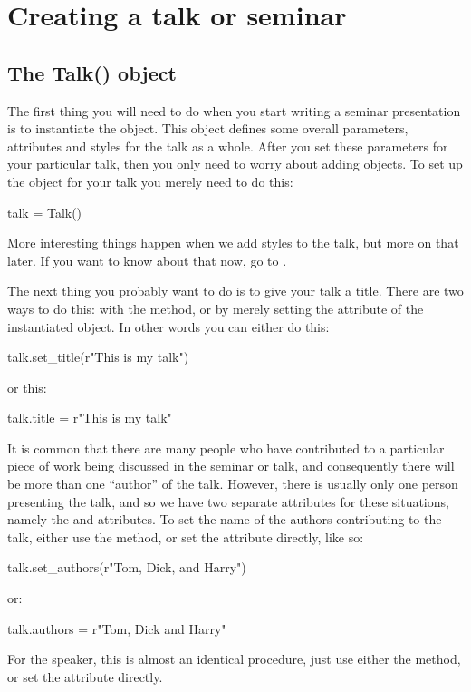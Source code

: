 \section{Creating a talk or seminar}

\subsection{The Talk() object}

The first thing you will need to do when you start writing a seminar
presentation is to instantiate the  object.  This object defines
some overall parameters, attributes and styles for the talk as a whole.
After you set these parameters for your particular talk, then you only need
to worry about adding  objects.  To set up the 
object for your talk you merely need to do this:
\begin{python}
talk = Talk()
\end{python}
More interesting things happen when we add styles to the talk, but more on
that later.  If you want to know about that now, go to .

The next thing you probably want to do is to give your talk a title.  There
are two ways to do this: with the  method, or by merely
setting the  attribute of the instantiated  object.
In other words you can either do this:
\begin{python}
talk.set_title(r"This is my talk")
\end{python}
or this:
\begin{python}
talk.title = r"This is my talk"
\end{python}

It is common that there are many people who have contributed to a particular
piece of work being discussed in the seminar or talk, and consequently there
will be more than one ``author'' of the talk.  However, there is usually
only one person presenting the talk, and so we have two separate attributes
for these situations, namely the  and  attributes.
To set the name of the authors contributing to the talk, either use the
 method, or set the attribute directly, like so:
\begin{python}
talk.set_authors(r"Tom, Dick, and Harry")
\end{python}
or:
\begin{python}
talk.authors = r"Tom, Dick and Harry"
\end{python}
For the speaker, this is almost an identical procedure, just use either the
 method, or set the  attribute directly.

